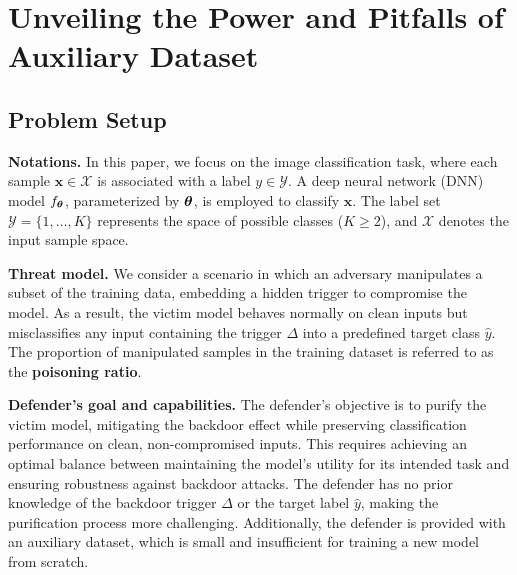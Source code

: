 \section{Unveiling the Power and Pitfalls of Auxiliary Dataset}


\subsection{Problem Setup}
\label{sec::pre}
\textbf{Notations.} 
In this paper, we focus on the image classification task, where each sample $\mathbf{x} \in \mathcal{X}$ is associated with a label $y \in \mathcal{Y}$. A deep neural network (DNN) model $f_{{\bm{\theta}}}$, parameterized by ${\bm{\theta}}$, is employed to classify $\mathbf{x}$. The label set $\mathcal{Y} = \{1, \dots, K\}$ represents the space of possible classes ($K \geq 2$), and $\mathcal{X}$ denotes the input sample space. 



\textbf{Threat model.}
We consider a scenario in which an adversary manipulates a subset of the training data, embedding a hidden trigger to compromise the model. As a result, the victim model behaves normally on clean inputs but misclassifies any input containing the trigger $\Delta$ into a predefined target class $\hat{y}$. The proportion of manipulated samples in the training dataset is referred to as the \textbf{poisoning ratio}.

\textbf{Defender's goal and capabilities.}
The defender’s objective is to purify the victim model, mitigating the backdoor effect while preserving classification performance on clean, non-compromised inputs. This requires achieving an optimal balance between maintaining the model’s utility for its intended task and ensuring robustness against backdoor attacks. The defender has no prior knowledge of the backdoor trigger $\Delta$ or the target label $\hat{y}$, making the purification process more challenging. Additionally, the defender is provided with an auxiliary dataset, which is small and insufficient for training a new model from scratch.



